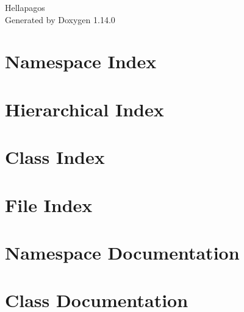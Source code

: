\documentclass[twoside]{book}
\newcommand{\+}{\discretionary{\mbox{\scriptsize$\hookleftarrow$}}{}{}}
\newcommand{\clearemptydoublepage}{%
    \newpage{\pagestyle{empty}\cleardoublepage}%
  }
\begin{document}
  \raggedbottom
    \hypersetup{pageanchor=false,
                bookmarksnumbered=true,
                pdfencoding=unicode
               }
  \begin{titlepage}
  \vspace*{7cm}
  \begin{center}%
  {\Large Hellapagos}\\
  \vspace*{1cm}
  {\large Generated by Doxygen 1.14.0}\\
  \end{center}
  \end{titlepage}
  \clearemptydoublepage
  \tableofcontents
  \clearemptydoublepage
  \hypersetup{pageanchor=true}
\chapter{Namespace Index}

\chapter{Hierarchical Index}

\chapter{Class Index}

\chapter{File Index}

\chapter{Namespace Documentation}


\chapter{Class Documentation}






















\end{document}
